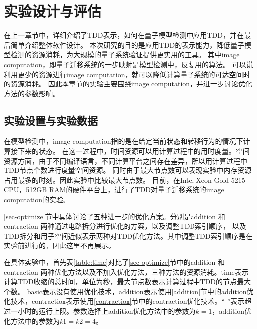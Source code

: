 \chapter{实验设计与评估}
在上一章节中，详细介绍了TDD表示，如何在量子模型检测中应用TDD，并在最后简单介绍整体软件设计。
本次研究的目的是应用TDD的表示能力，降低量子模型检测的资源消耗，为大规模的量子系统验证提供更实用的工具。
其中image computation，即量子迁移系统的一步映射是模型检测中，反复用的算法。
可以说利用更少的资源进行image computation，就可以降低计算量子系统的可达空间时的资源消耗。
因此本章节的实验主要围绕image computation，并进一步讨论优化方法的参数影响。
\section{实验设置与实验数据}
在模型检测中，image computation指的是在给定当前状态和转移行为的情况下计算接下来的状态。
在这一过程中，时间资源可以用计算过程中的用时度量。空间资源方面，由于不同编译语言，不同计算平台之间存在差异，所以用计算过程中TDD节点个数进行度量空间资源。
同时由于最大节点数可以表现实验中内存资源占用最多的时刻。因此实验中比较最大节点数。
目前，在Intel Xeon-Gold-5215 CPU，512GB RAM的硬件平台上，进行了TDD对量子迁移系统的image computation的实验。

\ref{sec-optimize}节中具体讨论了五种进一步的优化方案。分别是addition 和 contraction 两种通过电路拆分进行优化的方案，以及调整TDD索引顺序，
以及TDD拆分和用子空间近似表示两种对TDD优化方法。其中调整TDD索引顺序是在实验前进行的，因此这里不再展示。

在具体实验中，首先表\ref{table:time}对比了\ref{sec-optimize}节中的addition 和 contraction 两种优化方法以及不加入优化方法，三种方法的资源消耗。time表示计算TDD收缩的总时间，单位为秒，最大节点数表示计算过程中TDD的节点最大个数。
basic表示没有使用优化技术，addition表示使用\ref{addition}节中的addition优化技术，contraction表示使用\ref{contraction}节中的contraction优化技术。“-”表示超过一小时的运行上限。参数选择上addition优化方法中的参数为$k=1$，addition优化方法中的参数为$k1=k2=4$。

